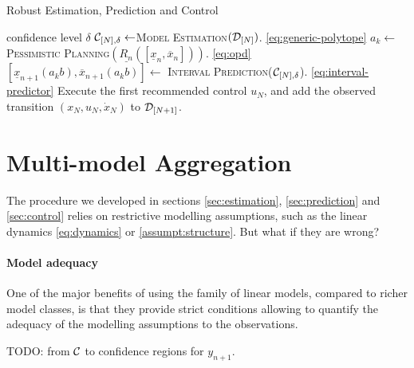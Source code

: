 \documentclass{article}
\begin{document}
\begin{algorithm}[tb]
	\caption{Robust Estimation, Prediction and Control}
	\label{alg:full}
	\begin{algorithmic}
		 confidence level $\delta$
		\STATE $\mathcal{C}_{[N],\delta} \gets$\textsc{Model Estimation}$(\mathcal{D}_{[N]})$. \eqref{eq:generic-polytope}
		\STATE $a_k\gets$\textsc{Pessimistic Planning}$(\underline{R_n}([\underline{x}_{n}, \overline{x}_{n}]))$.  \eqref{eq:opd}
		\STATE $[\underline{x}_{n+1}(a_k b), \overline{x}_{n+1}(a_k b)]\gets$ \textsc{Interval Prediction}($\mathcal{C}_{[N],\delta}$). \eqref{eq:interval-predictor}
		\ENDFOR
		\ENDFOR
		\STATE Execute the first recommended control $u_N$, and add the observed transition $(x_N, u_N, \dot{x}_N)$ to $\mathcal{D}_{[N+1]}$.
		\ENDFOR
	\end{algorithmic}
\end{algorithm}

\section{Multi-model Aggregation}

The procedure we developed in sections \ref{sec:estimation}, \ref{sec:prediction} and \ref{sec:control} relies on restrictive modelling assumptions, such as the linear dynamics \eqref{eq:dynamics} or \autoref{assumpt:structure}. But what if they are wrong?

\paragraph{Model adequacy}

One of the major benefits of using the family of linear models, compared to richer model classes, is that they provide strict conditions allowing to quantify the adequacy of the modelling assumptions to the observations.

TODO: from $\mathcal{C}$ to confidence regions for $y_{n+1}$.

\end{document}
